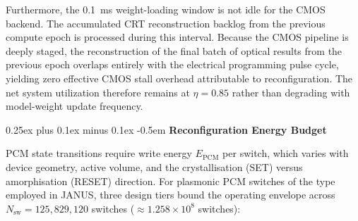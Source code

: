 \documentclass[journal]{IEEEtran}
\makeatletter
\newcommand{\subparagraph}{\@startsection{subparagraph}{5}{\parindent}%
  {0.25ex plus 0.1ex minus 0.1ex}%
  {-0.5em}%
  {\normalfont\normalsize\itshape}} %
\makeatother
\begin{document}
Furthermore, the 0.1~ms weight-loading window is not idle for the CMOS backend. The accumulated CRT reconstruction backlog from the previous compute epoch is processed during this interval. Because the CMOS pipeline is deeply staged, the reconstruction of the final batch of optical results from the previous epoch overlaps entirely with the electrical programming pulse cycle, yielding zero effective CMOS stall overhead attributable to reconfiguration. The net system utilization therefore remains at $\eta = 0.85$ rather than degrading with model-weight update frequency.

\subparagraph{\textbf{Reconfiguration Energy Budget}}

PCM state transitions require write energy $E_{\text{PCM}}$ per switch, which varies with device geometry, active volume, and the crystallisation (SET) versus amorphisation (RESET) direction. For plasmonic PCM switches of the type employed in JANUS, three design tiers bound the operating envelope across $N_{\text{sw}} = 125,829,120$ switches ($\approx 1.258 \times 10^8$ switches):
\end{document}
